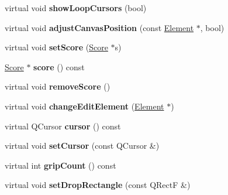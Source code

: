 \begin{DoxyCompactItemize}
virtual void {\bfseries show\+Loop\+Cursors} (bool)
\item 
\mbox{\label{class_ms_1_1_muse_score_view_afed20ae11bbe7129eff5e013734fefdf}} 
virtual void {\bfseries adjust\+Canvas\+Position} (const \hyperlink{class_ms_1_1_element}{Element} $\ast$, bool)
\item 
\mbox{\label{class_ms_1_1_muse_score_view_ada3167c78f2ddfb10692d4686b3d73f5}} 
virtual void {\bfseries set\+Score} (\hyperlink{class_ms_1_1_score}{Score} $\ast$s)
\item 
\mbox{\label{class_ms_1_1_muse_score_view_a65ec08ade4d6eb8ded10ebbcb88604cc}} 
\hyperlink{class_ms_1_1_score}{Score} $\ast$ {\bfseries score} () const
\item 
\mbox{\label{class_ms_1_1_muse_score_view_a05f48a7c51f09ea712e0be184fff2d1f}} 
virtual void {\bfseries remove\+Score} ()
\item 
\mbox{\label{class_ms_1_1_muse_score_view_a1437e50571283d3f406c250a66026a99}} 
virtual void {\bfseries change\+Edit\+Element} (\hyperlink{class_ms_1_1_element}{Element} $\ast$)
\item 
\mbox{\label{class_ms_1_1_muse_score_view_a0e2535e845477f4a00e4e58a03cf3b29}} 
virtual Q\+Cursor {\bfseries cursor} () const
\item 
\mbox{\label{class_ms_1_1_muse_score_view_a1cb48f67b4c53fbc9631f3303e42e3ca}} 
virtual void {\bfseries set\+Cursor} (const Q\+Cursor \&)
\item 
\mbox{\label{class_ms_1_1_muse_score_view_a98304109ba420cf175219a6434249b73}} 
virtual int {\bfseries grip\+Count} () const
\item 
\mbox{\label{class_ms_1_1_muse_score_view_ad7748481b8aeb5dff410911dbcaf6a0c}} 
virtual void {\bfseries set\+Drop\+Rectangle} (const Q\+RectF \&)
\item 
\mbox{\label{class_ms_1_1_muse_score_view_ae49dd3c6a8e8ae7d453e0c48cc9c9ce3}} 

\end{DoxyCompactItemize}
